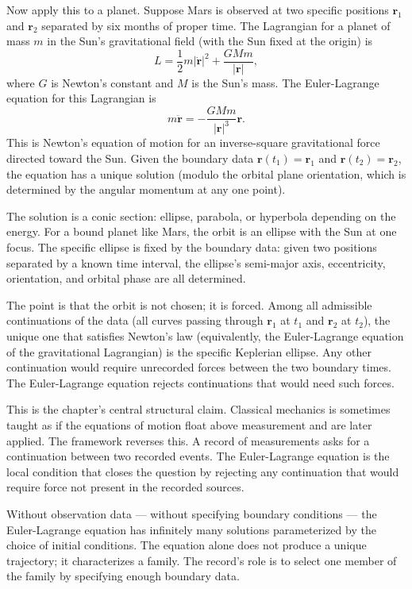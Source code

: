 Now apply this to a planet. Suppose Mars is observed at two specific
positions $\mathbf{r}_1$ and $\mathbf{r}_2$ separated by six months of
proper time. The Lagrangian for a planet of mass $m$ in the Sun's
gravitational field (with the Sun fixed at the origin) is
\[
L = \frac{1}{2} m |\dot{\mathbf{r}}|^2 + \frac{GMm}{|\mathbf{r}|},
\]
where $G$ is Newton's constant and $M$ is the Sun's mass. The Euler-Lagrange
equation for this Lagrangian is
\[
m\ddot{\mathbf{r}} = -\frac{GMm}{|\mathbf{r}|^3} \mathbf{r}.
\]
This is Newton's equation of motion for an inverse-square gravitational
force directed toward the Sun. Given the boundary data $\mathbf{r}(t_1) =
\mathbf{r}_1$ and $\mathbf{r}(t_2) = \mathbf{r}_2$, the equation has a
unique solution (modulo the orbital plane orientation, which is determined
by the angular momentum at any one point).

The solution is a conic section: ellipse, parabola, or hyperbola
depending on the energy. For a bound planet like Mars, the orbit is an
ellipse with the Sun at one focus. The specific ellipse is fixed by the
boundary data: given two positions separated by a known time interval,
the ellipse's semi-major axis, eccentricity, orientation, and orbital
phase are all determined.

The point is that the orbit is not chosen; it is forced. Among all
admissible continuations of the data (all curves passing through
$\mathbf{r}_1$ at $t_1$ and $\mathbf{r}_2$ at $t_2$), the unique one
that satisfies Newton's law (equivalently, the Euler-Lagrange equation
of the gravitational Lagrangian) is the specific Keplerian ellipse.
Any other continuation would require unrecorded forces between the two
boundary times. The Euler-Lagrange equation rejects continuations that
would need such forces.

This is the chapter's central structural claim. Classical mechanics is
sometimes taught as if the equations of motion float above measurement
and are later applied. The framework reverses this. A record of
measurements asks for a continuation between two recorded events. The
Euler-Lagrange equation is the local condition that closes the question
by rejecting any continuation that would require force not present in the
recorded sources.

Without observation data --- without specifying boundary conditions ---
the Euler-Lagrange equation has infinitely many solutions parameterized
by the choice of initial conditions. The equation alone does not produce
a unique trajectory; it characterizes a family. The record's role is to
select one member of the family by specifying enough boundary data.

